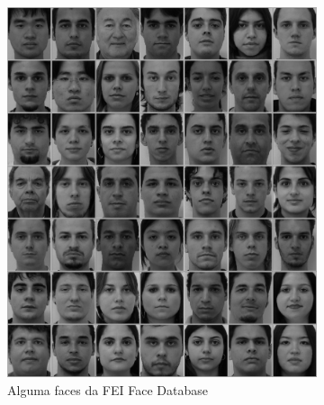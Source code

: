 \begin{figure}[htbp]
    \centering
    \caption{Eigenfaces}
    \label{fig:eigenfaces_faces}
    \begin{subfigure}[t]{0.3\textwidth}
    \centering
    \includegraphics[width=\textwidth]{imagens/faces_fei.jpg}
    \caption{Alguma faces da FEI Face Database}
    \end{subfigure}
    \begin{subfigure}[t]{0.3\textwidth}
    \centering

\end{subfigure}
\end{figure}

